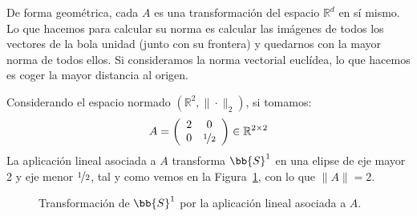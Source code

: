 De forma geométrica, cada $A$ es una transformación del espacio $\mathbb{R}^d$ en sí mismo. Lo que hacemos para calcular su norma es calcular las imágenes de todos los vectores de la bola unidad (junto con su frontera) y quedarnos con la mayor norma de todos ellos. Si consideramos la norma vectorial euclídea, lo que hacemos es coger la mayor distancia al origen.

\begin{ejemplo}
    Considerando el espacio normado $(\mathbb{R}^2, \|\cdot \|_2)$, si tomamos:
    \begin{equation*}
        A = \left(\begin{array}{cc}
                2 & 0 \\
                0 & \nicefrac{1}{2}
        \end{array}\right) \in \mathbb{R}^{2\times 2}
    \end{equation*}
    La aplicación lineal asociada a $A$ transforma $\bb{S}^1$ en una elipse de eje mayor 2 y eje menor $\nicefrac{1}{2}$, tal y como vemos en la Figura~\ref{fig:S1_fA}, con lo que $\|A\| = 2$.

    \begin{figure}[H]
        \centering
{}        
\caption{Transformación de $\bb{S}^1$ por la aplicación lineal asociada a $A$.}
\label{fig:S1_fA}
    \end{figure}
\end{ejemplo}

